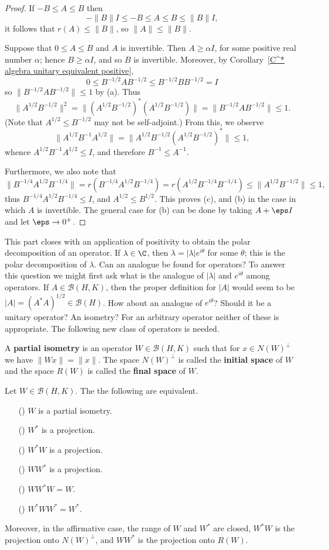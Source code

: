 \begin{proof}
If $-B\leq A\leq B$ then
\[-\|B\|I\leq-B\leq A\leq B\leq\|B\|I,\]
it follows that $r(A)\leq\|B\|$, so $\|A\|\leq\|B\|$.\par
Suppose that $0\leq A\leq B$ and $A$ is invertible. Then $A\geq\alpha I$, for some positive real number $\alpha$; hence $B\geq\alpha I$, and so $B$ is invertible. Moreover, by Corollary~\ref{C^* algebra unitary equivalent positive},
\[0\leq B^{-1/2}AB^{-1/2}\leq B^{-1/2}BB^{-1/2}=I\]
so $\|B^{-1/2}AB^{-1/2}\|\leq 1$ by (a). Thus
\[\|A^{1/2}B^{-1/2}\|^2=\|(A^{1/2}B^{-1/2})^*(A^{1/2}B^{-1/2})\|=\|B^{-1/2}AB^{-1/2}\|\leq 1.\]
(Note that $A^{1/2}\leq B^{-1/2}$ may not be self-adjoint.) From this, we observe
\[\|A^{1/2}B^{-1}A^{1/2}\|=\|A^{1/2}B^{-1/2}(A^{1/2}B^{-1/2})^*\|\leq 1,\]
whence $A^{1/2}B^{-1}A^{1/2}\leq I$, and therefore $B^{-1}\leq A^{-1}$.\par
Furthermore, we also note that
\[\|B^{-1/4}A^{1/2}B^{-1/4}\|=r(B^{-1/4}A^{1/2}B^{-1/4})=r(A^{1/2}B^{-1/4}B^{-1/4})\leq\|A^{1/2}B^{-1/2}\|\leq 1,\]
thus $B^{-1/4}A^{1/2}B^{-1/4}\leq I$, and $A^{1/2}\leq B^{1/2}$. This proves (c), and (b) in the case in which $A$ is invertible. The general case for (b) can be done by taking $A+\eps I$ and let $\eps\to 0^+$.
\end{proof}
This part closes with an application of positivity to obtain the polar decomposition of an operator. If $\lambda\in\C$, then $\lambda=|\lambda|e^{i\theta}$ for some $\theta$; this is the polar decomposition of $\lambda$. Can an analogue be found for operators? To answer this question we might first ask what is the analogue of $|\lambda|$ and $e^{i\theta}$ among operators. If $A\in\mathcal{B}(H,K)$, then the proper definition for $|A|$ would seem to be $|A|=(A^*A)^{1/2}\in\mathcal{B}(H)$. How about an analogue of $e^{i\theta}$? Should it be a unitary operator? An isometry? For an arbitrary operator neither of these is appropriate. The following new class of operators is needed.
\begin{definition}
A \textbf{partial isometry} is an operator $W\in\mathcal{B}(H,K)$ such that for $x\in N(W)^\bot$ we have $\|Wx\|=\|x\|$. The space $N(W)^\bot$ is called the \textbf{initial space} of $W$ and the space $R(W)$ is called the \textbf{final space} of $W$.
\end{definition}
\begin{proposition}\label{Hilbert space partial isometry iff}
Let $W\in\mathcal{B}(H,K)$. The the following are equivalent.
\begin{itemize}
\item[(\rmnum{1})] $W$ is a partial isometry. 
\item[(\rmnum{2})] $W^*$ is a projection.
\item[(\rmnum{3})] $W^*W$ is a projection.
\item[(\rmnum{4})] $WW^*$ is a projection.
\item[(\rmnum{5})] $WW^*W=W$.
\item[(\rmnum{6})] $W^*WW^*=W^*$.  
\end{itemize}
Moreover, in the affirmative case, the range of $W$ and $W^*$ are closed, $W^*W$ is the projection onto $N(W)^\bot$, and $WW^*$ is the projection onto $R(W)$.
\end{proposition}

